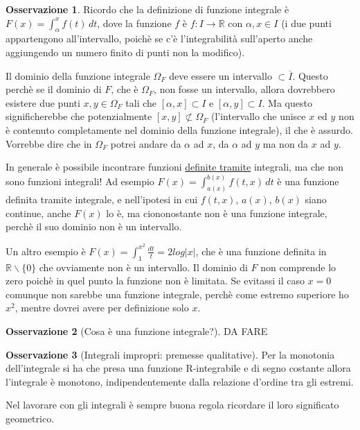 \documentclass{article}
\theoremstyle{definition}
\theoremstyle{definition}
\theoremstyle{definition}
\theoremstyle{definition}
\newtheorem{remark}{Osservazione}[section]
\theoremstyle{definition}
\theoremstyle{definition}
\begin{document}
\begin{remark}
    Ricordo che la definizione di funzione integrale è $\displaystyle{F(x)=\int_\alpha^x f(t)\,dt}$, dove la funzione $f$ è $f:I\rightarrow\mathbb{R}$ con $\alpha,x\in I$ (i due punti appartengono all'intervallo, poichè se c'è l'integrabilità sull'aperto anche aggiungendo un numero finito di punti non la modifico).

    Il dominio della funzione integrale $\Omega_F$ deve essere un intervallo $\subset \overline{I}$. Questo perchè se il dominio di $F$, che è $\Omega_F$, non fosse un intervallo, allora dovrebbero esistere due punti $x,y\in\Omega_F$ tali che $[\alpha,x]\subset I$ e $[\alpha,y]\subset I$. Ma questo significherebbe che potenzialmente $[x,y]\not\subset\Omega_F$ (l'intervallo che unisce $x$ ed $y$ non è contenuto completamente nel dominio della funzione integrale), il che è assurdo. Vorrebbe dire che in $\Omega_F$ potrei andare da $\alpha$ ad $x$, da $\alpha$ ad $y$ ma non da $x$ ad $y$.

    \vspace{3mm}

    In generale è possibile incontrare funzioni \underline{definite tramite} integrali, ma che non sono funzioni integrali! Ad esempio $\displaystyle{F(x)=\int_{a(x)}^{b(x)}f(t,x)\,dt}$ è una funzione definita tramite integrale, e nell'ipotesi in cui $f(t,x)$, $a(x)$, $b(x)$ siano continue, anche $F(x)$ lo è, ma ciononostante non è una funzione integrale, perchè il suo dominio non è un intervallo.

    \vspace{3mm}

    Un altro esempio è $\displaystyle{F(x)=\int_1^{x^2}\frac{dt}{t}}=2log\left|x\right|$, che è una funzione definita in $\mathbb{R}\backslash\lbrace0\rbrace$ che ovviamente non è un intervallo. Il dominio di $F$ non comprende lo zero poichè in quel punto la funzione non è limitata. Se evitassi il caso $x=0$ comunque non sarebbe una funzione integrale, perchè come estremo superiore ho $x^2$, mentre dovrei avere per definizione solo $x$.
\end{remark}

\begin{remark}[Cosa è una funzione integrale?]
    DA FARE
\end{remark}

\begin{remark}[Integrali impropri: premesse qualitative]
    Per la monotonia dell'integrale si ha che presa una funzione R-integrabile e di segno costante allora l'integrale è monotono, indipendentemente dalla relazione d'ordine tra gli estremi.

    Nel lavorare con gli integrali è sempre buona regola ricordare il loro significato geometrico.
\end{remark}
\end{document}
